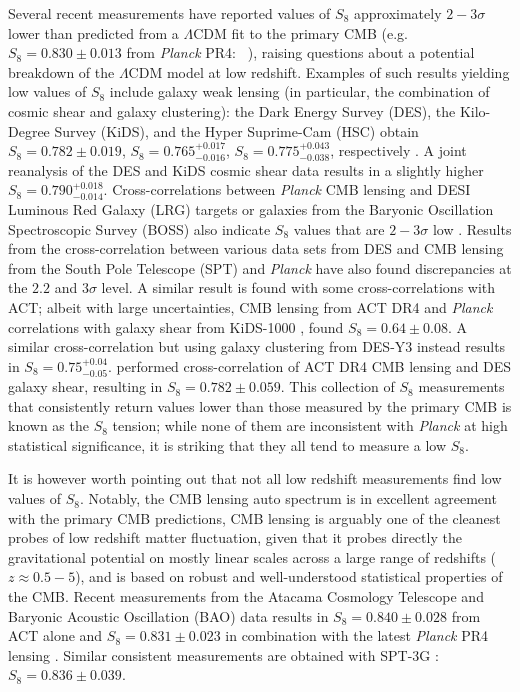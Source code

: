 \documentclass[twocolumn]{aastex631}
\def\citejap#1{\citeauthor{#1}\ \citeyear{#1}}
\begin{document}
    Several recent measurements have reported values of $S_8$ approximately $2-3\sigma$ lower than predicted from a $\Lambda$CDM fit to the primary CMB (e.g. $S_8=0.830\pm0.013$ from {\it Planck\/} PR4: \citejap{Rosenberg_2022}), raising questions about a potential breakdown of the $\Lambda$CDM model at low redshift. Examples of such results yielding low values of $S_8$ include galaxy weak lensing (in particular, the combination of cosmic shear and galaxy clustering): the Dark Energy Survey (DES), the Kilo-Degree Survey (KiDS), and the Hyper Suprime-Cam (HSC) obtain $S_8 =0.782\pm 0.019$,  $S_8 = 0.765^{+0.017}_{-0.016}$, $S_8=0.775^{+0.043}_{-0.038}$, respectively \citep{2022PhRvD.105b3520A,2021A+A...646A.140H,2023PhRvD.108l3521S}. A joint reanalysis of the DES and KiDS cosmic shear data \citep{2023DESKiDs} results in a slightly higher $S_8=0.790^{+0.018}_{-0.014}$.
    Cross-correlations between \textit{Planck} CMB lensing and 
    DESI Luminous Red Galaxy (LRG) targets \citep{White:2021yvw} or galaxies from the Baryonic Oscillation Spectroscopic Survey (BOSS) also indicate $S_8$ values that are $2-3\sigma$ low \citep{Singh:2018kmr, Chen_2022}. Results from the cross-correlation between various data sets from DES and CMB lensing from the South Pole Telescope (SPT) and \textit{Planck} \citep{2023PhRvD.107b3530C,2023PhRvD.107b3531A} have also found discrepancies at the $2.2$ and $3\sigma$ level. A similar result is found with some cross-correlations with ACT; albeit with large uncertainties,  CMB lensing from ACT DR4 and \textit{Planck} correlations with galaxy shear from KiDS-1000 \citep{Robertson_2021}, found $S_8=0.64\pm0.08$. A similar cross-correlation but using galaxy clustering from DES-Y3 \citep{2024JCAP...01..033M} instead results in $S_8=0.75^{+0.04}_{-0.05}$. \cite{ACT:2023skz} performed cross-correlation of ACT DR4 CMB lensing and DES galaxy shear, resulting in $S_8=0.782\pm0.059$. This collection of $S_8$ measurements that consistently return values lower than those measured by the primary CMB is known as the $S_8$ tension; while none of them are inconsistent with \textit{Planck} at high statistical significance, it is striking that they all tend to measure a low $S_8$.

It is however worth pointing out that not all low redshift measurements find low values of $S_8$. Notably,  the CMB lensing auto spectrum is in excellent agreement with the primary CMB predictions,  CMB lensing is arguably one of the cleanest probes of low redshift matter fluctuation, given that it probes directly the gravitational potential on mostly linear scales across a large range of redshifts ($z\approx0.5-5$), and is based on robust and well-understood statistical properties of the CMB. Recent measurements from the Atacama Cosmology Telescope \citep[ACT; ][]{qu2023atacama,ACT:2023kun} and Baryonic Acoustic Oscillation (BAO) data results in $S_8=0.840\pm0.028$ from ACT alone and $S_8=0.831\pm0.023$ in combination with the latest \textit{Planck} PR4 lensing \citep{Carron:2022}. Similar consistent measurements are obtained with SPT-3G \citep{Pan_2023}: $S_8=0.836\pm0.039$.
\end{document}
